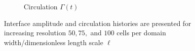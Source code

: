 \begin{figure}
\begin{subfigure}{0.5\textwidth}
    \caption{Circulation $\Gamma(t)$}
  \end{subfigure}
  \caption{Interface amplitude and circulation histories are presented for increasing resolution $50, 75,$ and $100$ cells per domain width/dimensionless length scale $\ell$}
\end{figure}


